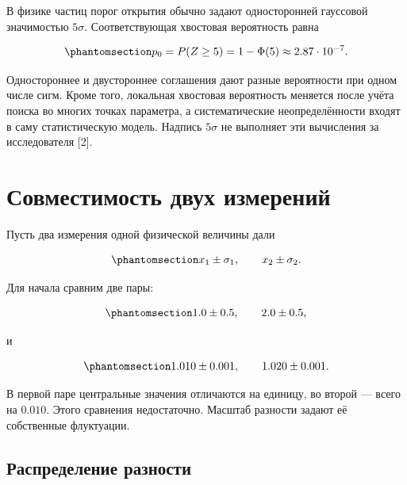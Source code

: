 \documentclass[
  russian,
  11pt,
  a4paper,
  open=any]{scrbook}
\begin{document}
В физике частиц порог открытия обычно задают односторонней гауссовой
значимостью \(5\sigma\). Соответствующая хвостовая вероятность равна

\begin{equation}\protect\phantomsection\label{eq-five-sigma-one-sided-tail}{
p_0=P(Z\ge5)=1-\Phi(5)\approx2.87\cdot10^{-7}.
}\end{equation}

Одностороннее и двустороннее соглашения дают разные вероятности при
одном числе сигм. Кроме того, локальная хвостовая вероятность меняется
после учёта поиска во многих точках параметра, а систематические
неопределённости входят в саму статистическую модель. Надпись
\(5\sigma\) не выполняет эти вычисления за исследователя {[}2{]}.

\section{Совместимость двух измерений}\label{interactive-compatibility}

Пусть два измерения одной физической величины дали

\begin{equation}\protect\phantomsection\label{eq-two-measurement-results}{
x_1\pm\sigma_1,
\qquad
x_2\pm\sigma_2.
}\end{equation}

Для начала сравним две пары:

\begin{equation}\protect\phantomsection\label{eq-compatibility-example-wide}{
1.0\pm0.5,
\qquad
2.0\pm0.5,
}\end{equation}

и

\begin{equation}\protect\phantomsection\label{eq-compatibility-example-precise}{
1.010\pm0.001,
\qquad
1.020\pm0.001.
}\end{equation}

В первой паре центральные значения отличаются на единицу, во второй ---
всего на \(0.010\). Этого сравнения недостаточно. Масштаб разности
задают её собственные флуктуации.

\subsection{Распределение
разности}\label{ux440ux430ux441ux43fux440ux435ux434ux435ux43bux435ux43dux438ux435-ux440ux430ux437ux43dux43eux441ux442ux438}
\end{document}
